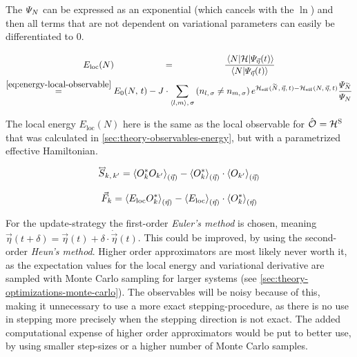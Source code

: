 The $\psiN$ can be expressed as an exponential (which cancels with the $\ln$) and then all terms that are not dependent on variational parameters can easily be differentiated to 0.

\begin{equation}
    \label{eq:local-energy-definition}
    \begin{gathered}
        E_\text{loc}(N) \stackrel{\phantom{\ref{eq:energy-local-observable}}}{=} \frac{
            \bracketHelper{N}{\hamiltonian}{\psiEta{\vec{\eta}}{t}}
        }{
            \braketHelper{N}{\psiEta{\vec{\eta}}{t}}
        } 
        \\
        \stackrel{\ref{eq:energy-local-observable}}{=}
        E_0(N,\,t)-
        J \cdot \neighborsumWSpin{l}{m}{\sigma}
        \left(n_{l,\,\sigma} \neq n_{m,\,\sigma}\right)
            e^{\HeffOft[\vphantom{N}\smash{\tilde{N}},\,\vec{\eta}]-\HeffOft[N,\,\vec{\eta}]}
        \frac{
            \psiN[\vphantom{N}\smash{\tilde{N}}]
        }{
            \psiN[N]
        }
    \end{gathered}
\end{equation}

The local energy $E_\text{loc}(N)$ here is the same as the local observable  for $\ObservableOp = \pictureHamiltonian[\schroedingerPicture]$ that was calculated in \autoref{sec:theory-observables-energy}, but with a parametrized effective Hamiltonian.

\begin{equation}
    \label{eq:covariance-matrix}
    \matvec{S}_{k,\, k'} = \timelessEtaExpectationVal{O_{k}^\ast O_{k'}} - \timelessEtaExpectationVal{O_{k}^\ast} \cdot \timelessEtaExpectationVal{O_{k'} \vphantom{O_{k}^\ast}}
\end{equation}

\begin{equation}
    \label{eq:tdvp-force}
    \vec{F}_k = \timelessEtaExpectationVal{E_\text{loc} O_{k}^\ast} - \timelessEtaExpectationVal{E_\text{loc}  \vphantom{O_{k}^\ast}} \cdot \timelessEtaExpectationVal{O_{k}^\ast}
\end{equation}


For the update-strategy the first-order \emph{Euler's method} is chosen, meaning $\vec{\eta}(t + \delta) = \vec{\eta}(t) + \delta \cdot \dot{\vec{\eta}}(t)$.
This could be improved, by using the second-order \emph{Heun's method}. 
Higher order approximators are most likely never worth it, as the expectation values for the local energy and variational derivative are sampled with Monte Carlo sampling for larger systems (see \autoref{sec:theory-optimizations-monte-carlo}).
The observables will be noisy because of this, making it unnecessary to use a more exact stepping-procedure, as there is no use in stepping more precisely when the stepping direction is not exact.
The added computational expense of higher order approximators would be put to better use, by using smaller step-sizes or a higher number of Monte Carlo samples.

